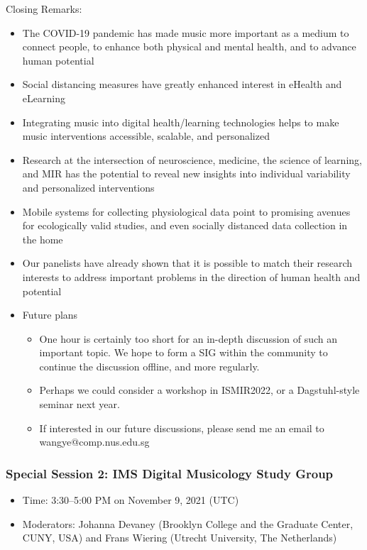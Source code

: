 \documentclass[%
10pt,								%
titlepage,						%
]
{scrartcl}
\begin{document}
        Closing Remarks:
        \begin{itemize}
            \item   The COVID-19 pandemic has made music more important as a medium to connect people, to enhance both physical and mental health, and to advance human potential
            \item   Social distancing measures have greatly enhanced interest in eHealth and eLearning
            \item   Integrating music into digital health/learning technologies helps to make music interventions accessible, scalable, and personalized
            \item   Research at the intersection of neuroscience, medicine, the science of learning, and MIR has the potential to reveal new insights into individual variability and personalized interventions
            \item   Mobile systems for collecting physiological data point to promising avenues for ecologically valid studies, and even socially distanced data collection in the home
            \item   Our panelists have already shown that it is possible to match their research interests to address important problems in the direction of human health and potential
            \item   Future plans
                \begin{itemize}
                    \item   One hour is certainly too short for an in-depth discussion of such an important topic. We hope to form a SIG within the community to continue the discussion offline, and more regularly.
                    \item   Perhaps we could consider a workshop in ISMIR2022, or a Dagstuhl-style seminar next year.
                    \item   If interested in our future discussions, please send me an email to wangye@comp.nus.edu.sg

                \end{itemize}
        \end{itemize}
        
 
        \subsubsection{Special Session 2: IMS Digital Musicology Study Group}
        \begin{itemize}
            \item   Time: 3:30--5:00 PM on November 9, 2021 (UTC)

            \item   Moderators: Johanna Devaney (Brooklyn College and the Graduate Center, CUNY, USA) and Frans Wiering (Utrecht University, The Netherlands)
        \end{itemize}
\end{document}
